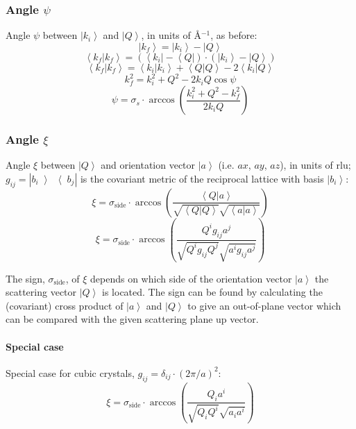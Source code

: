 \documentclass{article}
\begin{document}
\subsubsection*{Angle $\psi$}
Angle $\psi$ between $\left| k_i \right>$ and $\left| Q \right>$, in units of \AA{}$^{-1}$, as before:
\begin{equation} \left| k_f \right> = \left| k_i \right> - \left| Q \right> \end{equation}
\begin{equation} \left< k_f | k_f \right> = \left( \left< k_i \right| - \left< Q \right| \right) \cdot \left( \left| k_i \right> - \left| Q \right> \right) \end{equation}
\begin{equation} \left< k_f | k_f \right> = \left< k_i | k_i \right> + \left< Q | Q \right> - 2 \left< k_i | Q \right> \end{equation}
\begin{equation} k_f^2 = k_i^2 + Q^2 - 2 k_i Q \cos \psi \end{equation}
\begin{equation} \boxed{ \psi = \sigma_s \cdot \arccos \left( \frac{k_i^2 + Q^2 - k_f^2}{2 k_i Q} \right) } \end{equation}


\subsubsection*{Angle $\xi$}
Angle $\xi$ between $\left| Q \right>$ and orientation vector $\left| a \right>$ (i.e. $ax$, $ay$, $az$), in units of rlu; $g_{ij} = \left| b_i \left> \right< b_j \right|$ is the covariant metric of the reciprocal lattice with basis $\left| b_i \right>$:
\begin{equation} \xi = \sigma_{\mathrm{side}} \cdot \arccos \left( \frac{ \left< Q | a \right> }{ \sqrt{\left< Q | Q \right>} \sqrt{\left< a | a \right>} } \right) \end{equation}
\begin{equation} \boxed{ \xi = \sigma_{\mathrm{side}} \cdot \arccos \left( \frac{ Q^i g_{ij} a^j }{ \sqrt{Q^i g_{ij} Q^j} \sqrt{a^i g_{ij} a^j} } \right) } \end{equation}

The sign, $\sigma_{\mathrm{side}}$, of $\xi$ depends on which side of the orientation vector $\left| a \right>$ the scattering vector $\left| Q \right>$ is located. The sign can be found by calculating the (covariant) cross product of $\left| a \right>$ and $\left| Q \right>$ to give an out-of-plane vector which can be compared with the given scattering plane up vector.


\paragraph*{Special case}
Special case for cubic crystals, $g_{ij} = \delta_{ij} \cdot \left( 2\pi / a \right)^2$:
\begin{equation} \xi = \sigma_{\mathrm{side}} \cdot \arccos \left( \frac{ Q_i a^i }{ \sqrt{Q_i Q^i} \sqrt{a_i a^i} } \right) \end{equation}
\end{document}
